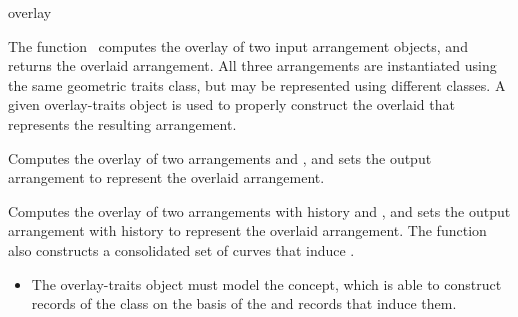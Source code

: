 \ccRefPageBegin

\begin{ccRefFunction}{overlay}

\ccDefinition

The function \ccRefName\ computes the overlay of two input arrangement
objects, and returns the overlaid arrangement. All three arrangements
are instantiated using the same geometric traits class, but may be
represented using different \dcel{} classes. A given overlay-traits object
is used to properly construct the overlaid \dcel{} that represents the
resulting arrangement.



Computes the overlay of two arrangements  and , and sets
the output arrangement  to represent the overlaid arrangement.




Computes the overlay of two arrangements with history  and
, and sets the output arrangement with history  to
represent the overlaid arrangement. The function also constructs a
consolidated set of curves that induce .

\ccRequirements
\begin{itemize}
\item The overlay-traits object  must model the 
  concept, which is able to construct records of the  class on
  the basis of the  and  records that induce them.
\end{itemize}

\ccSeeAlso

\end{ccRefFunction}

\ccRefPageEnd
